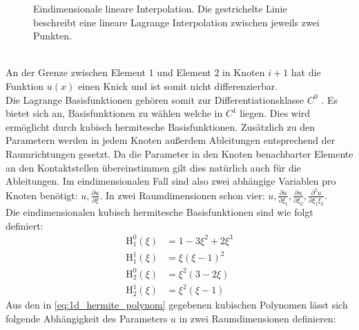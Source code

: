 \documentclass[
	a4paper,			%
	11pt,				%
	headsepline,		%
	bibtotoc,			%
	BCOR18mm,      		%
	DIV14,				%
	headings=normal,
	numbers=noenddot,
]{scrbook}
\theoremstyle{mythmstyle}
\theoremstyle{other}
\begin{document}
	 	\begin{figure}[h]
	 	\begin{center} 
	 	
	 	\end{center}
	 	\caption{Eindimensionale lineare Interpolation. Die gestrichelte Linie
	 	beschreibt eine lineare Lagrange Interpolation zwischen jeweils zwei
	 	 Punkten.}
	 	 \label{figure:1d_linear_lagrange}
	 	\end{figure}\\
	 	An der Grenze zwischen Element $1$ und Element $2$ in Knoten $i+1$ 
	 	hat die Funktion $u(x)$ einen Knick und ist somit nicht differenzierbar.
	 	\\ 
	 	Die Lagrange Basisfunktionen gehören somit zur Differentiationsklasse $C^0$
	 	\cite[S.~55]{modelling}. Es bietet sich an, Basisfunktionen zu
	 	wählen welche in $C^1$ liegen. Dies wird ermöglicht durch
	 	kubisch hermitesche Basisfunktionen. Zusätzlich zu den Parametern werden
	 	in jedem Knoten außerdem Ableitungen entsprechend der Raumrichtungen
	 	gesetzt. Da die Parameter in den Knoten benachbarter Elemente an den 
	 	Kontaktstellen übereinstimmen gilt dies natürlich auch für die
	 	Ableitungen. Im eindimensionalen Fall sind also zwei abhängige Variablen
	 	pro Knoten benötigt: $u, \frac{\partial u}{\partial \xi}$. In zwei
	 	Raumdimensionen schon vier: $u, \frac{\partial u}{\partial \xi_1},
	 	\frac{\partial u}{\partial \xi_2}, \frac{\partial^2 u}{\partial \xi_1 
	 	\xi_2}$. \cite[S.~58]{modelling}
	 	\\Die eindimensionalen kubisch hermitesche Basisfunktionen sind wie folgt definiert:
	 	\begin{equation}
	 	\begin{split}
	 	\mathrm{H}^0_1(\xi) &= 1 -3\xi^2 + 2\xi^3 \\
		\mathrm{H}^1_1(\xi) &= \xi(\xi-1)^2\\
		\mathrm{H}^0_2(\xi) &= \xi^2(3-2\xi)\\
		\mathrm{H}^1_2(\xi) &= \xi^2(\xi-1)
	 	\end{split}
	 	\label{eq:1d_hermite_polynom}
	 	\end{equation}
	 	Aus den in \autoref{eq:1d_hermite_polynom} gegebenen kubischen Polynomen lässt
	 	sich folgende Abhängigkeit des Parameters $u$ in zwei Raumdimensionen definieren\cite{paper2}:
	 	
\end{document}
